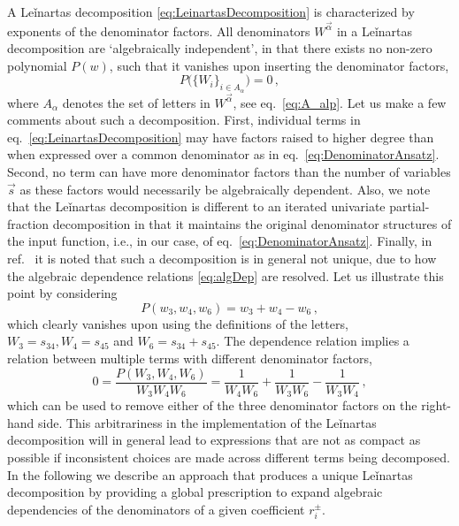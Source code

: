 A Leǐnartas decomposition \eqref{eq:LeinartasDecomposition}
is characterized by exponents of the denominator factors. 
All denominators $W^{\vec \alpha}$
in a Leǐnartas decomposition  are `algebraically independent', in that
there exists no non-zero polynomial  
$P(w)$, such that it vanishes upon inserting the denominator factors, 
\begin{equation}\label{eq:algDep}
P\big(\{ W_i \}_{i\in A_\alpha}\big )=0\,,
\end{equation}
where $A_\alpha$ denotes the set of letters in $W^{\vec \alpha}$, see eq.~\eqref{eq:A_alp}.
Let us make a few comments about such a decomposition.  First, individual terms
in eq.~\eqref{eq:LeinartasDecomposition} may have factors raised to higher
degree than when expressed over a common denominator as in 
eq.~\eqref{eq:DenominatorAnsatz}. Second, no term can have
more denominator factors than the number of variables $\vec s$ as these factors would
necessarily be algebraically dependent.  Also, we note that the Leǐnartas
decomposition is different to an iterated univariate partial-fraction decomposition in that
it maintains the original denominator structures of the input 
function, i.e., in our case, of eq.~\eqref{eq:DenominatorAnsatz}. Finally, in
ref.~\cite{raichev2012leinartas} it is noted that such a
decomposition is in general not unique, due to how the algebraic dependence relations
\eqref{eq:algDep} are resolved.
Let us illustrate this point by considering
\begin{equation} 
P(w_3,w_4,w_6)=w_3 + w_4 - w_6\,,
\end{equation} 
which clearly vanishes upon 
using the definitions of the letters, 
$W_3=s_{34}, W_4=s_{45} $ and 
$W_6 =s_{34} + s_{45}$. 
The dependence relation implies a relation between multiple terms with different denominator factors,
\begin{equation}\label{eq:arbitraryLeinartas}
0= \frac{P(W_3,W_4,W_6)}{W_3 W_4 W_6} 
= \frac{1}{W_4 W_6} + \frac{1}{W_3 W_6} - \frac{1}{W_3 W_4}\,, 
\end{equation}
which can be used to remove either of the three denominator factors on the right-hand side.
This arbitrariness in the implementation of the Leǐnartas decomposition will
in general lead to expressions that are not as compact as possible if inconsistent choices
are made across different terms being decomposed.
In the following we describe
an approach that produces a unique Leǐnartas decomposition by providing 
a global prescription to expand algebraic dependencies of the denominators of a given
coefficient $r_i^{\pm}$.

